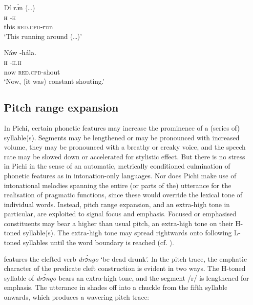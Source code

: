 \ea%
    \label{ex:key:60}
    \gll   Dí  rɔ́n (…)\\
\textsc{h}  \textsc{{}-h}\\
this  \textsc{red.cpd-}run\\
\glt ‘This running around (…)’
\z

\ea
	\label{ex:key:61}
\gll    Náw    -hála.\\
\textsc{h}    \textsc{{}-h.h}\\
now    \textsc{red.cpd}{}-shout\\
\glt ‘Now, (it was) constant shouting.’\\
\z

\subsection{Pitch range expansion}\label{sec:3.2.5}

In Pichi, certain phonetic features may increase the prominence of a (series of) syllable(s). Segments may be lengthened or may be pronounced with increased volume, they may be pronounced with a breathy or creaky voice, and the speech rate may be slowed down or accelerated for stylistic effect. But there is no stress in Pichi in the sense of an automatic, metrically conditioned culmination of phonetic features as in intonation-only languages. Nor does Pichi make use of intonational melodies spanning the entire (or parts of the) utterance for the realisation of pragmatic functions, since these would override the lexical tone of individual words. Instead, pitch range expansion, and an extra-high tone in particular, are exploited to signal focus and emphasis. Focused or emphasised constituents may bear a higher than usual pitch, an extra-high tone on their H-toned syllable(s). The extra-high tone may spread rightwards onto following L-toned syllables until the word boundary is reached (cf. ). 

 features the clefted verb \textit{drɔ́ngo} ‘be dead drunk’. In the pitch trace, the emphatic character of the predicate cleft construction is evident in two ways. The H-toned syllable of \textit{drɔ́ngo} bears an extra-high tone, and the segment /r/ is lengthened for emphasis. The utterance in  shades off into a chuckle from the fifth syllable onwards, which produces a wavering pitch trace:

